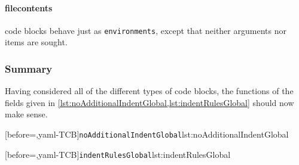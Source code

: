 	\paragraph{filecontents} code blocks behave just as \texttt{environments}, except that
		neither arguments nor items are sought.

\subsubsection{Summary}
	Having considered all of the different types of code blocks, the functions of the fields
	given in \cref{lst:noAdditionalIndentGlobal,lst:indentRulesGlobal} should now make sense.

	\begin{widepage}
		\begin{minipage}{.47\linewidth}
			[before=\centering,yaml-TCB]{\texttt{noAdditionalIndentGlobal}}{lst:noAdditionalIndentGlobal}
		\end{minipage}%
		\hfill
		\begin{minipage}{.47\linewidth}
			[before=\centering,yaml-TCB]{\texttt{indentRulesGlobal}}{lst:indentRulesGlobal}
		\end{minipage}%
	\end{widepage}
